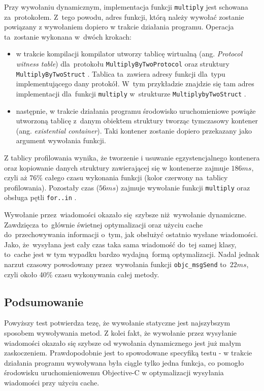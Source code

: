 \documentclass[mgr, shortabstract]{iithesis}
\newcommand{\ang}[1]{ang. \textit{#1}}
\newcommand{\swiftinline}[1]{
    \texttt{#1}
}
\newcommand{\objcinline}[1]{
    \texttt{#1}
}
\begin{document}
Przy wywołaniu dynamicznym, implementacja funkcji \swiftinline{multiply} jest schowana za~protokołem. Z~tego powodu, adres funkcji, którą należy wywołać zostanie powiązany z wywołaniem dopiero w trakcie działania programu. Operacja ta~zostanie wykonana w~dwóch krokach:

\begin{itemize}
    \item w trakcie kompilacji kompilator utworzy tablicę wirtualną (\ang{Protocol witness table}) dla~protokołu \swiftinline{MultiplyByTwoProtocol} oraz struktury \swiftinline{MultiplyByTwoStruct}. Tablica ta~zawiera adresy funkcji dla~typu implementującego dany protokół. W~tym przykładzie znajdzie się tam adres implementacji dla~funkcji \swiftinline{multiply} w~strukturze \swiftinline{MultiplybyTwoStruct}.
    \item następnie, w trakcie działania programu środowisko uruchomieniowe powiąże utworzoną tablicę z~danym obiektem struktury tworząc tymczasowy kontener (\ang{existential container}). Taki kontener zostanie dopiero przekazany jako argument wywołania funkcji.
\end{itemize}

Z tablicy profilowania wynika, że tworzenie i usuwanie  egzystencjalnego kontenera oraz kopiowanie danych struktury zawierającej się w kontenerze zajmuje $186ms$, czyli aż 76\% całego czasu wykonania funkcji (kolor czerwony na~tablicy profilowania). Pozostały czas ($56ms$) zajmuje wywołanie funkcji \swiftinline{multiply} oraz obsługa pętli \swiftinline{for..in}.

Wywołanie przez~wiadomości okazało się szybsze niż wywołanie dynamiczne. Zawdzięcza to~głównie świetnej optymalizacji oraz użyciu cache do~przechowywania informacji o~tym, jak obsłużyć ostatnio wysłane wiadomości. Jako, że~wysyłana jest cały czas taka sama wiadomość do~tej samej klasy, to~cache jest w tym wypadku bardzo wydajną formą optymalizacji. Nadal jednak narzut czasowy powodowany przez~wywołania funkcji \objcinline{objc_msgSend} to~$22ms$, czyli około 40\% czasu wykonywania całej metody.

\subsection{Podsumowanie}

Powyższy test potwierdza tezę, że wywołanie statyczne jest najszybszym sposobem wywoływania metod. Z kolei fakt, że wywołanie przez wysyłanie wiadomości okazało się szybsze od wywołania dynamicznego jest już małym zaskoczeniem. Prawdopodobnie jest to spowodowane specyfiką testu - w trakcie działania programu wywoływana była ciągle tylko jedna funkcja, co pomogło środowisku uruchomieniowemu Objective-C w optymalizacji wysyłania wiadomości przy użyciu cache.
\end{document}
